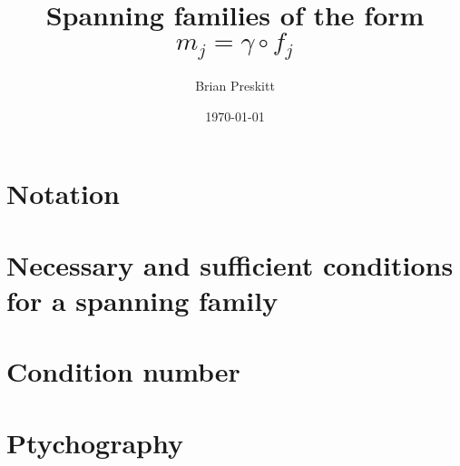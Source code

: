 

\title{Spanning families of the form $m_j = \gamma \circ f_j$}
\author{Brian Preskitt}
\date{\today}

\maketitle
\section{Notation}

\section{Necessary and sufficient conditions for a spanning family}

\section{Condition number}

\label{sec:con_number}
\section{Ptychography}


